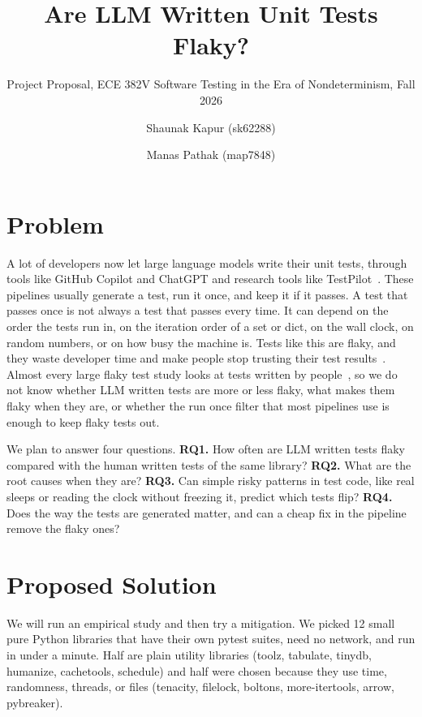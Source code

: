 \documentclass[sigconf,nonacm]{acmart}
\begin{document}
\title{Are LLM Written Unit Tests Flaky?}
\subtitle{Project Proposal, ECE 382V Software Testing in the Era of Nondeterminism, Fall 2026}

\author{Shaunak Kapur (sk62288)}
\author{Manas Pathak (map7848)}

\maketitle

\section{Problem}
A lot of developers now let large language models write their unit tests, through tools like GitHub Copilot and ChatGPT and research tools like TestPilot~\cite{schafer2024}. These pipelines usually generate a test, run it once, and keep it if it passes. A test that passes once is not always a test that passes every time. It can depend on the order the tests run in, on the iteration order of a set or dict, on the wall clock, on random numbers, or on how busy the machine is. Tests like this are flaky, and they waste developer time and make people stop trusting their test results~\cite{parry2021}. Almost every large flaky test study looks at tests written by people~\cite{luo2014,gruber2021}, so we do not know whether LLM written tests are more or less flaky, what makes them flaky when they are, or whether the run once filter that most pipelines use is enough to keep flaky tests out.

We plan to answer four questions. \textbf{RQ1.} How often are LLM written tests flaky compared with the human written tests of the same library? \textbf{RQ2.} What are the root causes when they are? \textbf{RQ3.} Can simple risky patterns in test code, like real sleeps or reading the clock without freezing it, predict which tests flip? \textbf{RQ4.} Does the way the tests are generated matter, and can a cheap fix in the pipeline remove the flaky ones?

\section{Proposed Solution}
We will run an empirical study and then try a mitigation. We picked 12 small pure Python libraries that have their own pytest suites, need no network, and run in under a minute. Half are plain utility libraries (toolz, tabulate, tinydb, humanize, cachetools, schedule) and half were chosen because they use time, randomness, threads, or files (tenacity, filelock, boltons, more-itertools, arrow, pybreaker).
\end{document}
